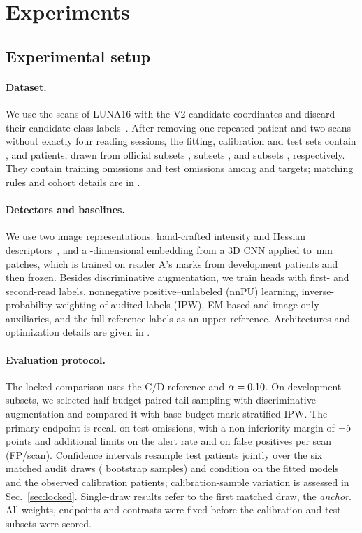 \section{Experiments}
\label{sec:yield}

\subsection{Experimental setup}
\label{sec:setup}

\paragraph{Dataset.}
We use the \NScans{} scans of LUNA16 with the V2 candidate coordinates and discard their candidate class labels~\cite{setio2017,luna16v2}. After removing one repeated patient and two scans without exactly four reading sessions, the fitting, calibration and test sets contain \NFit{}, \NCal{} and \NTest{} patients, drawn from official subsets \FitSubsets{}, subsets \CalSubsets{}, and subsets \TestSubsets{}, respectively. They contain \NOmitTrain{} training omissions and \NOmitTest{} test omissions among \NTargetTrain{} and \NTargetTest{} targets; matching rules and cohort details are in .

\paragraph{Detectors and baselines.}
We use two image representations: \NDescriptors{} hand-crafted intensity and Hessian descriptors~\cite{li2003}, and a \EmbedDim{}-dimensional embedding from a 3D CNN applied to \PatchMM\,mm patches, which is trained on reader A's marks from \NDevPatients{} development patients and then frozen. Besides discriminative augmentation, we train heads with first- and second-read labels, nonnegative positive--unlabeled (nnPU) learning, inverse-probability weighting of audited labels (IPW), EM-based and image-only auxiliaries, and the full reference labels as an upper reference. Architectures and optimization details are given in .

\paragraph{Evaluation protocol.}
The locked comparison uses the C/D reference and $\alpha=0.10$. On development subsets, we selected half-budget paired-tail sampling with discriminative augmentation and compared it with base-budget mark-stratified IPW. The primary endpoint is recall on test omissions, with a non-inferiority margin of $-5$ points and additional limits on the alert rate and on false positives per scan (FP/scan). Confidence intervals resample test patients jointly over the six matched audit draws (\NBoot{} bootstrap samples) and condition on the fitted models and the observed calibration patients; calibration-sample variation is assessed in Sec.~\ref{sec:locked}. Single-draw results refer to the first matched draw, the \emph{anchor}. All weights, endpoints and contrasts were fixed before the calibration and test subsets were scored.

